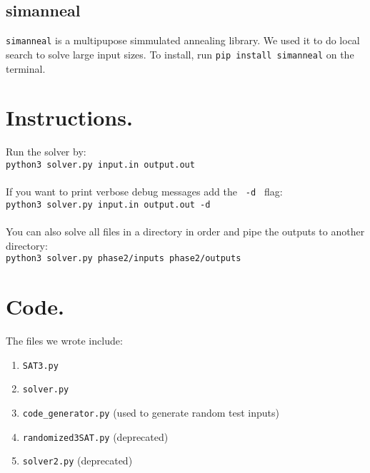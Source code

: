 \documentclass{article}
\theoremstyle{plain}
\numberwithin{theorem}{subsection}
\theoremstyle{definition}
\numberwithin{equation}{subsection}
\begin{document}
\subsection{simanneal} \texttt{simanneal} is a multipupose simmulated annealing library. We used it to do local search to solve large input sizes. To install, run \texttt{pip install simanneal} on the terminal.

\section{Instructions.}
Run the solver by:\\
\texttt{python3 solver.py input.in output.out} \\\\
If you want to print verbose debug messages add the \texttt{ -d } flag: \\
\texttt{python3 solver.py input.in output.out -d} \\\\
You can also solve all files in a directory in order and pipe the outputs to another directory:\\
\texttt{python3 solver.py phase2/inputs phase2/outputs}\\

\section{Code.}
The files we wrote include: 
\begin{enumerate}
    \item \texttt{SAT3.py}
    \item \texttt{solver.py}
    \item \texttt{code\_generator.py} (used to generate random test inputs)
    \item \texttt{randomized3SAT.py} (deprecated)
    \item \texttt{solver2.py} (deprecated)
\end{enumerate}
\end{document}
